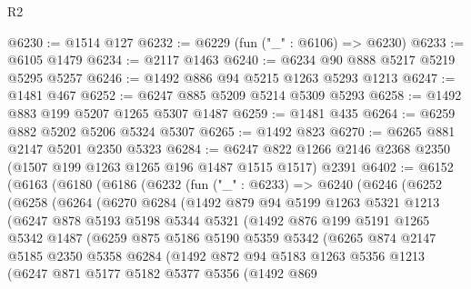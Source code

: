 \begin{lexlean}{R2}
\begin{coremodule}
@6230 := @1514 @127
@6232 := @6229 (fun ("_" : @6106) => @6230)
@6233 := @6105 @1479
@6234 := @2117 @1463
@6240 := @6234 @90 @888 @5217 @5219 @5295 @5257
@6246 := @1492 @886 @94 @5215 @1263 @5293 @1213
@6247 := @1481 @467
@6252 := @6247 @885 @5209 @5214 @5309 @5293
@6258 := @1492 @883 @199 @5207 @1265 @5307 @1487
@6259 := @1481 @435
@6264 := @6259 @882 @5202 @5206 @5324 @5307
@6265 := @1492 @823
@6270 := @6265 @881 @2147 @5201 @2350 @5323
@6284 := @6247 @822 @1266 @2146 @2368 @2350 (@1507 @199 @1263 @1265 @196 @1487 @1515 @1517) @2391
@6402 := @6152
    (@6163
      (@6180
        (@6186
          (@6232
            (fun ("_" : @6233) =>
            @6240
              (@6246
                (@6252
                  (@6258
                    (@6264
                      (@6270
                        @6284
                        (@1492
                          @879
                          @94
                          @5199
                          @1263
                          @5321
                          @1213
                          (@6247
                            @878
                            @5193
                            @5198
                            @5344
                            @5321
                            (@1492
                              @876
                              @199
                              @5191
                              @1265
                              @5342
                              @1487
                              (@6259
                                @875
                                @5186
                                @5190
                                @5359
                                @5342
                                (@6265
                                  @874
                                  @2147
                                  @5185
                                  @2350
                                  @5358
                                  @6284
                                  (@1492
                                    @872
                                    @94
                                    @5183
                                    @1263
                                    @5356
                                    @1213
                                    (@6247
                                      @871
                                      @5177
                                      @5182
                                      @5377
                                      @5356
                                      (@1492
                                        @869

\end{coremodule}
\end{lexlean}
